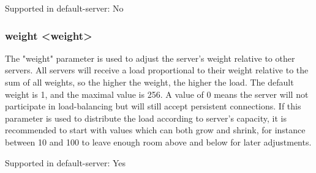  Supported in default-server: No

\subsubsection[weight]{weight <weight>}
  The "weight" parameter is used to adjust the server's weight relative to
  other servers. All servers will receive a load proportional to their weight
  relative to the sum of all weights, so the higher the weight, the higher the
  load. The default weight is 1, and the maximal value is 256. A value of 0
  means the server will not participate in load-balancing but will still accept
  persistent connections. If this parameter is used to distribute the load
  according to server's capacity, it is recommended to start with values which
  can both grow and shrink, for instance between 10 and 100 to leave enough
  room above and below for later adjustments.

  Supported in default-server: Yes
